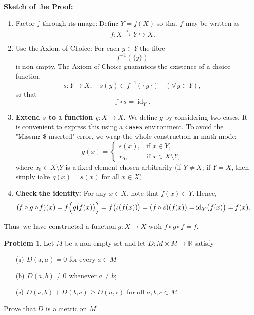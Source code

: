 \documentclass[12pt]{article}
\theoremstyle{definition} %
\newtheorem{problem}{Problem}
\theoremstyle{plain} %
\begin{document}
\textbf{Sketch of the Proof:}
\begin{enumerate}
    \item Factor \(f\) through its image:
          Define \(Y=f(X)\) so that \(f\) may be written as 
          \[
              f:X \xrightarrow{\;f\;} Y \hookrightarrow X.
          \]
    \item Use the Axiom of Choice:
          For each \(y\in Y\) the fibre 
          \[
              f^{-1}(\{y\})
          \]
          is non‑empty. The Axiom of Choice guarantees the existence of a choice function 
          \[
              s:Y\to X,\quad s(y)\in f^{-1}(\{y\}) \quad (\forall\, y\in Y),
          \]
          so that
          \[
              f\circ s = \operatorname{id}_Y.
          \]
    \item \textbf{Extend \(s\) to a function \(g:X\to X\).}  
          We define \(g\) by considering two cases. It is convenient to express this using a \texttt{cases} environment. To avoid the "Missing \$ inserted" error, we wrap the whole construction in math mode:
          \[
          g(x)=
          \begin{cases}
             s(x), & \text{if } x\in Y, \\[3mm]
             x_0, & \text{if } x\in X\setminus Y,
          \end{cases}
          \]
          where \(x_{0}\in X\setminus Y\) is a fixed element chosen arbitrarily (if \(Y\neq X\); if \(Y=X\), then simply take \(g(x)=s(x)\) for all \(x\in X\)).
    \item \textbf{Check the identity:}  
          For any \(x\in X\), note that \(f(x)\in Y\). Hence,
          \[
              (f\circ g\circ f)(x) = f\Bigl(g\bigl(f(x)\bigr)\Bigr)
              = f\bigl(s(f(x))\bigr)
              = (f\circ s)(f(x))
              = \operatorname{id}_Y\bigl(f(x)\bigr)
              = f(x).
          \]
\end{enumerate}

Thus, we have constructed a function \(g:X\to X\) with \(f\circ g\circ f = f\).

\bigskip

\begin{problem}
    Let $M$ be a non‑empty set and let $D:M\times M\to\mathbb R$ satisfy
    \begin{enumerate}
    \item[(a)] $D(a,a)=0$ for every $a\in M$;
    \item[(b)] $D(a,b)\ne0$ whenever $a\ne b$;
    \item[(c)] $D(a,b)+D(b,c)\ge D(a,c)$ for all $a,b,c\in M$.
    \end{enumerate}
    Prove that $D$ is a metric on $M$.
    \end{problem}
    
\end{document}
